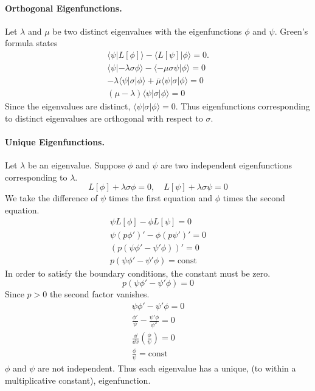 \paragraph{Orthogonal Eigenfunctions.}
Let $\lambda$ and $\mu$ be two distinct eigenvalues with the eigenfunctions
$\phi$ and $\psi$.  Green's formula states
\begin{gather*}
  \langle \psi | L[\phi] \rangle - \langle L[\psi] | \phi \rangle = 0. 
  \\
  \langle \psi | - \lambda \sigma \phi \rangle - \langle - \mu \sigma \psi | \phi \rangle = 0
  \\
  -\lambda \langle \psi | \sigma | \phi \rangle + \overline{\mu} \langle \psi | \sigma | \phi \rangle = 0 
  \\
  (\mu - \lambda) \langle \psi | \sigma | \phi \rangle = 0 
\end{gather*}
Since the eigenvalues are distinct, $\langle \psi | \sigma | \phi \rangle = 0$.
Thus eigenfunctions corresponding to distinct eigenvalues are orthogonal
with respect to $\sigma$.











\paragraph{Unique Eigenfunctions.}
Let $\lambda$ be an eigenvalue.  Suppose $\phi$ and $\psi$ are two independent
eigenfunctions corresponding to $\lambda$.  
\[
L[\phi] + \lambda \sigma \phi = 0,
\quad
L[\psi] + \lambda \sigma \psi = 0
\]
We take the difference of $\psi$ times the first equation and $\phi$ times 
the second equation.
\begin{gather*}
  \psi L[\phi] - \phi L[\psi] = 0 
  \\
  \psi (p \phi')' - \phi (p \psi')' = 0 
  \\
  (p (\psi \phi' - \psi' \phi))' = 0 
  \\
  p (\psi \phi' - \psi' \phi) = \mathrm{const}
\end{gather*}
In order to satisfy the boundary conditions, the constant must be zero.
\[ 
p (\psi \phi' - \psi' \phi) = 0 
\]
Since $p > 0$ the second factor vanishes.
\begin{gather*}
  \psi \phi' - \psi' \phi = 0 
  \\
  \frac{\phi'}{\psi} - \frac{\psi' \phi}{\psi^2} = 0 
  \\
  \frac{\dd}{\dd x} \left( \frac{\phi}{\psi} \right) = 0 
  \\
  \frac{\phi}{\psi} = \mathrm{const}
\end{gather*}
$\phi$ and $\psi$ are not independent.  Thus each eigenvalue has a 
unique, (to within a multiplicative constant), eigenfunction.






